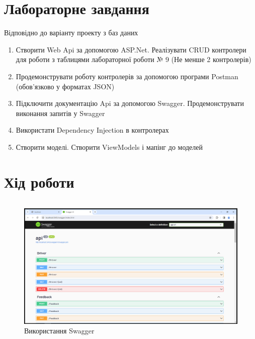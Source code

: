 \documentclass[14pt]{extreport}
\begin{document}
\begin{normalsize}
	\section*{Лабораторне завдання}
	Відповідно до варіанту проекту з баз даних 
	\begin{enumerate}
		\item Створити Web Api за допомогою ASP.Net. Реалізувати CRUD контролери для роботи з таблицями лабораторної роботи № 9 (Не менше 2 контролерів)  
		\item Продемонструвати роботу контролерів за допомогою програми Postman (обов’язково у форматах JSON)
		 
		\item Підключити документацію Api за допомогою Swagger. Продемонструвати виконання запитів у Swagger
		\item Використати Dependency Injection в контролерах
		\item Створити моделі. Створити ViewModels і мапінг до моделей 
	\end{enumerate}
	
	
	\section*{Хід роботи}
	
	\begin{small}
		\begin{lstlisting}
		\end{lstlisting}
	\end{small}
	
	\begin{figure}[H]
		\centering
		\includegraphics[scale=0.4]{1}
		\caption{Використання Swagger}
	\end{figure}
	

\end{normalsize}
\end{document}
